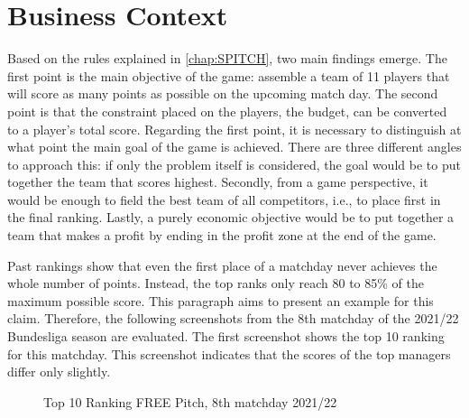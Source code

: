 \section{Business Context}

\label{chap:business_context}

Based on the rules explained in \autoref{chap:SPITCH}, two main findings emerge. The first point is the main objective of the game: assemble a team of 11 players that will score as many points as possible on the upcoming match day. The second point is that the constraint placed on the players, the budget, can be converted to a player's total score. Regarding the first point, it is necessary to distinguish at what point the main goal of the game is achieved. There are three different angles to approach this: if only the problem itself is considered, the goal would be to put together the team that scores highest. Secondly, from a game perspective, it would be enough to field the best team of all competitors, i.e., to place first in the final ranking. Lastly, a purely economic objective would be to put together a team that makes a profit by ending in the profit zone at the end of the game. 

Past rankings show that even the first place of a matchday never achieves the whole number of points. Instead, the top ranks only reach 80 to 85\% of the maximum possible score. This paragraph aims to present an example for this claim. Therefore, the following screenshots from the 8th matchday of the 2021/22 Bundesliga season are evaluated. The first screenshot shows the top 10 ranking for this matchday. This screenshot indicates that the scores of the top managers differ only slightly.

\begin{figure}[H]
    \centering
    \captionsetup{justification=centering}
    \caption{Top 10 Ranking FREE Pitch, 8th matchday 2021/22}
    \label{fig:top-10}
\end{figure}

